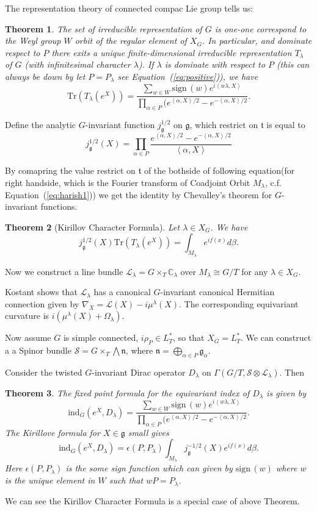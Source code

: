 \documentclass[12pt]{amsart}
\newtheorem{Thm}{Theorem}
\def\cL{{\mathcal{L}}}
\def\cS{{\mathcal{S}}}
\def\bC{{\mathbb{C}}}
\def\fgg{{\mathfrak{g}}}
\def\ftt{{\mathfrak{t}}}
\def\fnn{{\mathfrak{n}}}
\def\inn#1#2{\left<{#1},{#2}\right>}
\def\sign{\mathrm{sign\,}}
\def\ind{\mathrm{ind}}
\def\Tr{\mathrm{Tr}}
\begin{document}
The representation theory of connected compac Lie group tells us:
\begin{Thm}
The set of irreducible representation of $G$ is one-one correspond to 
the Weyl group $W$ orbit of the regular element of $X_G$.
In particular, 
and dominate respect to $P$ there exits a unique 
finite-dimensional irreducible representation $T_\lambda$ of $G$
(with infinitesimal character $\lambda$).
If $\lambda$ is dominate with respect to $P$ (this can always be down by let
$P=P_\lambda$ see Equation~(\ref{eq:positive})), we have 
\[
\Tr(T_\lambda(e^X)) = \frac{\sum_{w\in W}\sign(w)e^{i\inn{w\lambda}{X}}}{
\prod_{\alpha\in P}(e^{\inn{\alpha}{X}/2} - e^{-\inn{\alpha}{X}/2} }.
\] 
\end{Thm}

Define the analytic $G$-invariant function $j_\fgg^{1/2}$ on $\fgg$, 
which restrict on $\ftt$ is equal to 
\[
j_\fgg^{1/2} (X) 
= \prod_{\alpha\in P}\frac{e^{\inn{\alpha}{X}/2} - e^{-\inn{\alpha}{X}/2}}{\inn{\alpha}{X}}
\]

By comapring the value restrict on $\ftt$ of the bothside of following 
equation(for right handside, which is the Fourier transform of Coadjoint Orbit
$M_\lambda$, c.f. Equation~(\ref{eq:harish1}))
we get the identity by Chevalley's theorem 
for $G$-invariant functions.

\begin{Thm}[Kirillov Character Formula]
Let $\lambda\in X_G$. We have
\[
j_\fgg^{1/2}(X) \Tr(T_\lambda(e^X)) = \int_{M_\lambda}e^{if(x)} d\beta.
\] 
\end{Thm} 

Now we construct a line bundle $\cL_\lambda = G\times_T\bC_\lambda$ over
$M_\lambda \cong G/T$ for any $\lambda\in X_G$.

Kostant shows that $\cL_\lambda$ has a canonical $G$-invariant canonical 
Hermitian connection given by $\nabla_X = \cL(X) - i\mu^\lambda(X)$.
The corresponding equivariant curvature is $i(\mu^\lambda(X)+\Omega_\lambda)$.

Now assume $G$ is simple connected, $i\rho_P\in L^*_T$, so that $X_G = L_T^*$.
We can construct a a Spinor bundle $\cS = G\times_T\bigwedge \fnn$, where 
$\fnn = \bigoplus_{\alpha\in P} \fgg_\alpha$. %

Consider the twisted $G$-invariant Dirac operator 
$D_\lambda$ on $\Gamma(G/T,\cS\otimes \cL_\lambda)$.
Then
\begin{Thm}
The fixed point formula for the equivariant index of $D_\lambda$ is given by 
\[
\ind_G(e^X, D_\lambda) =  \frac{\sum_{w\in W}\sign(w)e^{i\inn{w\lambda}{X}}}{
\prod_{\alpha\in P}(e^{\inn{\alpha}{X}/2} - e^{-\inn{\alpha}{X}/2} }.
\]
The Kirillove formula for $X\in \fgg$ small gives 
\[
\ind_G(e^X, D_\lambda) = \epsilon(P,P_\lambda)\int_{M_\lambda} j_\fgg^{-1/2}(X)
e^{if(x)} d\beta.
\] 
Here $\epsilon(P,P_\lambda)$ is the some sign function which can given by 
$\sign(w)$ where $w$ is the unique element in $W$ such that $wP = P_\lambda$.
\end{Thm}
 We can see the Kirillov Character Formula is a special case of above Theorem.
\end{document}
